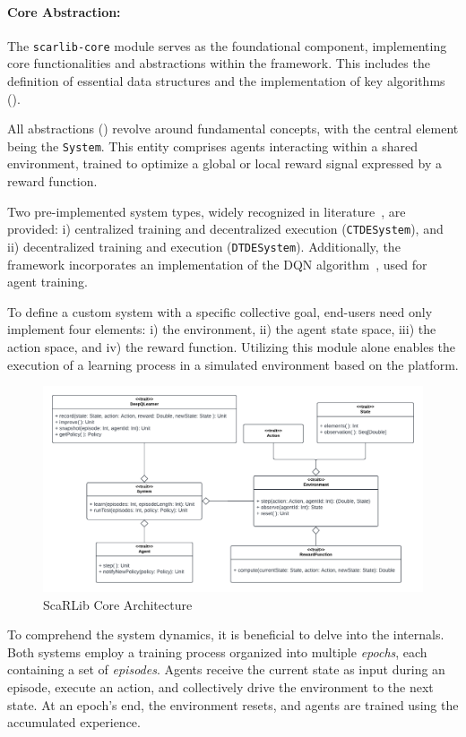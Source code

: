 \documentclass[12pt,a4paper,openright,twoside]{book}
\newcommand{\scarlib}{ScaRLib}
\begin{document}
\paragraph{Core Abstraction:} The \texttt{scarlib-core} module serves as the foundational component, implementing core functionalities and abstractions within the framework. This includes the definition of essential data structures and the implementation of key algorithms ().

All abstractions () revolve around fundamental concepts, with the central element being the \texttt{System}. This entity comprises agents interacting within a shared environment, trained to optimize a global or local reward signal expressed by a reward function.

Two pre-implemented system types, widely recognized in literature~\cite{Du2020}, are provided: i) centralized training and decentralized execution (\texttt{CTDESystem}), and ii) decentralized training and execution (\texttt{DTDESystem}). Additionally, the framework incorporates an implementation of the DQN algorithm~\cite{Mnih2015}, used for agent training.

To define a custom system with a specific collective goal, end-users need only implement four elements: i) the environment, ii) the agent state space, iii) the action space, and iv) the reward function. Utilizing this module alone enables the execution of a learning process in a simulated environment based on the platform.

\begin{figure}[t]
    \centering
    \includegraphics[width=\textwidth]{img/core-architecture.pdf}
    \caption{\scarlib{} Core Architecture \cite{scarlib}}
    \label{fig:arc}
\end{figure}

To comprehend the system dynamics, it is beneficial to delve into the internals. Both systems employ a training process organized into multiple \emph{epochs}, each containing a set of \emph{episodes}. Agents receive the current state as input during an episode, execute an action, and collectively drive the environment to the next state. At an epoch's end, the environment resets, and agents are trained using the accumulated experience.
\end{document}
